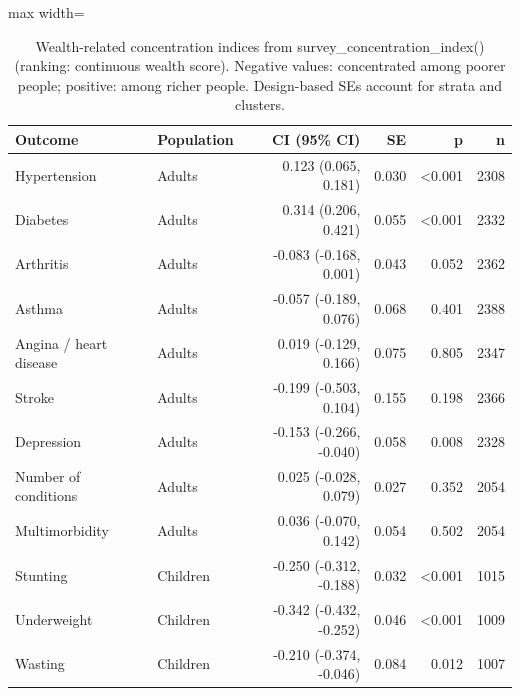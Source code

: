 \begin{table}[htbp]

\caption{\label{tab:tab_concentration_indices}Wealth-related concentration indices from survey\_concentration\_index() (ranking: continuous wealth score). Negative values: concentrated among poorer people; positive: among richer people. Design-based SEs account for strata and clusters.}
\centering
\small
\begin{adjustbox}{max width=\linewidth}
\begin{tabular}{llrrrr}
\toprule
Outcome & Population & CI (95\% CI) & SE & p & n\\
\midrule
Hypertension & Adults & 0.123 (0.065, 0.181) & 0.030 & <0.001 & 2308\\
Diabetes & Adults & 0.314 (0.206, 0.421) & 0.055 & <0.001 & 2332\\
Arthritis & Adults & -0.083 (-0.168, 0.001) & 0.043 & 0.052 & 2362\\
Asthma & Adults & -0.057 (-0.189, 0.076) & 0.068 & 0.401 & 2388\\
Angina / heart disease & Adults & 0.019 (-0.129, 0.166) & 0.075 & 0.805 & 2347\\
Stroke & Adults & -0.199 (-0.503, 0.104) & 0.155 & 0.198 & 2366\\
Depression & Adults & -0.153 (-0.266, -0.040) & 0.058 & 0.008 & 2328\\
Number of conditions & Adults & 0.025 (-0.028, 0.079) & 0.027 & 0.352 & 2054\\
Multimorbidity & Adults & 0.036 (-0.070, 0.142) & 0.054 & 0.502 & 2054\\
Stunting & Children & -0.250 (-0.312, -0.188) & 0.032 & <0.001 & 1015\\
Underweight & Children & -0.342 (-0.432, -0.252) & 0.046 & <0.001 & 1009\\
Wasting & Children & -0.210 (-0.374, -0.046) & 0.084 & 0.012 & 1007\\
\bottomrule
\end{tabular}
\end{adjustbox}
\end{table}

